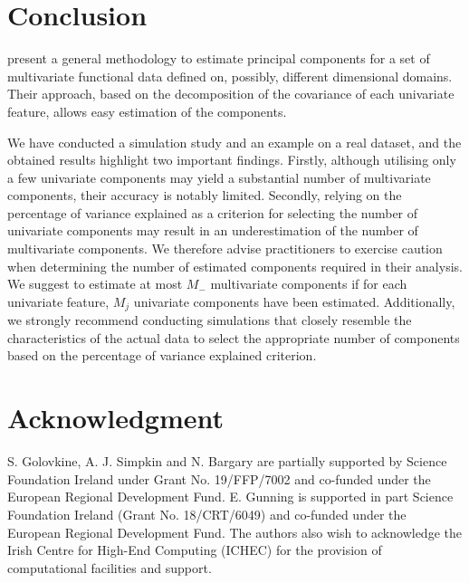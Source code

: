 \documentclass{article}
\newcounter{th}
\begin{document}
\section{Conclusion} %
\label{sec:conclusion}

\cite{happMultivariateFunctionalPrincipal2018} present a general methodology to estimate principal components for a set of multivariate functional data defined on, possibly, different dimensional domains. Their approach, based on the decomposition of the covariance of each univariate feature, allows easy estimation of the components.

We have conducted a simulation study and an example on a real dataset, and the obtained results highlight two important findings. Firstly, although utilising only a few univariate components may yield a substantial number of multivariate components, their accuracy is notably limited. Secondly, relying on the percentage of variance explained as a criterion for selecting the number of univariate components may result in an underestimation of the number of multivariate components. We therefore advise practitioners to exercise caution when determining the number of estimated components required in their analysis. We suggest to estimate at most $M_{-}$ multivariate components if for each univariate feature, $M_j$ univariate components have been estimated. Additionally, we strongly recommend conducting simulations that closely resemble the characteristics of the actual data to select the appropriate number of components based on the percentage of variance explained criterion.


\section*{Acknowledgment}

S. Golovkine, A. J. Simpkin and N. Bargary are partially supported by Science Foundation Ireland under Grant No. 19/FFP/7002 and co-funded under the European Regional Development Fund. E. Gunning is supported in part Science Foundation Ireland (Grant No. 18/CRT/6049) and co-funded under the European Regional Development Fund. The authors also wish to acknowledge the Irish Centre for High-End Computing (ICHEC) for the provision of computational facilities and support.



\end{document}
